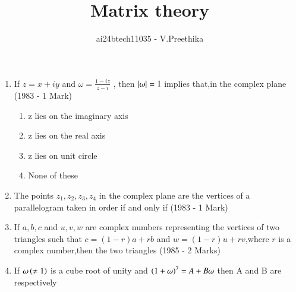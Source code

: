 \documentclass[journal]{IEEEtran}
\begin{document}

\vspace{3cm}

\title{Matrix theory}
\author{ai24btech11035 - V.Preethika}
\maketitle
\bigskip

\renewcommand{\thefigure}{\theenumi}
\renewcommand{\thetable}{\theenumi}

\begin{enumerate}[start=6]
\item If $z=x+iy$ and $\omega=\frac{1-iz}{z-i}$ , then $\left\vert\omega\right\vert=1$ implies that,in the complex plane
\hfill{(1983 - 1 Mark)}
\begin{enumerate}
\item z lies on the imaginary axis
\item z lies on the real axis
\item z lies on unit circle
\item None of these
\end{enumerate}
\item The points $z_1,z_2,z_3,z_4$ in the complex plane are the vertices of a parallelogram taken in order if and only if
\hfill{(1983 - 1 Mark)}
\begin{enumerate}
\end{enumerate}
\item If $a,b,c$ and $u,v,w$ are complex numbers representing the vertices of two triangles such that $c=(1-r)a+rb$ and $w=(1-r)u+rv$,where $r$ is a complex number,then the two triangles
\hfill{(1985 - 2 Marks)}
\begin{enumerate}
\end{enumerate}
\item If $\omega\left(\neq1\right)$ is a cube root of unity and $\left(1+\omega\right)^7=A+B\omega$ then A and B are respectively

\end{enumerate}
\end{document}
